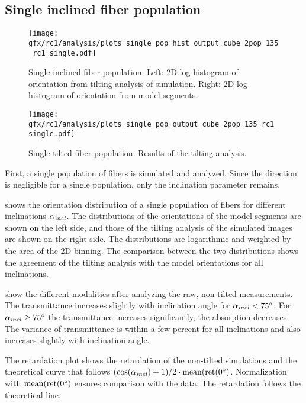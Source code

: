 \subsection{Single inclined fiber population}
\label{sec:resSingleIncl}
%
\begin{figure}[!t]
\centering
\texttt{[image: gfx/rc1/analysis/plots\_single\_pop\_hist\_output\_cube\_2pop\_135\_rc1\_single.pdf]}
\caption{Single inclined fiber population. Left: 2D log histogram of orientation from tilting analysis of simulation. Right: 2D log histogram of orientation from model segments.}
\label{fig:single_fiber_pop_hist}
\end{figure}
%
\begin{figure}[!p]
\centering
\texttt{[image: gfx/rc1/analysis/plots\_single\_pop\_output\_cube\_2pop\_135\_rc1\_single.pdf]}
\caption{Single tilted fiber population. Results of the tilting analysis.}
\label{fig:single_fiber_pop_rofl}
\end{figure}
%
First, a single population of fibers is simulated and analyzed.
Since the direction is negligible for a single population, only the inclination parameter \modelInc{} remains.
\par
%
 shows the orientation distribution of a single population of fibers for different inclinations $\textnormal{$\alpha_{\mathit{incl}}$}{}$.
The distributions of the orientations of the model segments are shown on the left side, and those of the tilting analysis of the simulated images are shown on the right side.
The distributions are logarithmic and weighted by the area of the 2D binning.
The comparison between the two distributions shows the agreement of the tilting analysis with the model orientations for all inclinations.
\par
%
 show the different modalities after analyzing the raw, non-tilted measurements.
The transmittance increases slightly with inclination angle for $\textnormal{$\alpha_{\mathit{incl}}$}<\SI{75}{\degree}$.
For $\textnormal{$\alpha_{\mathit{incl}}$} \ge \SI{75}{\degree}$ the transmittance increases significantly, \ie{} the absorption decreases.
The variance of transmittance is within a few percent for all inclinations and also increases slightly with inclination angle.
\par
%
The retardation plot shows the retardation of the non-tilted simulations and the theoretical curve that follows $(\cos(\textnormal{$\alpha_{\mathit{incl}}$}) + 1) / 2 \cdot \operatorname{mean}(\mathrm{ret}(\SI{0}{\degree})$.
Normalization with $\operatorname{mean}(\mathrm{ret}(\SI{0}{\degree})$ ensures comparison with the data.
The retardation follows the theoretical line.
